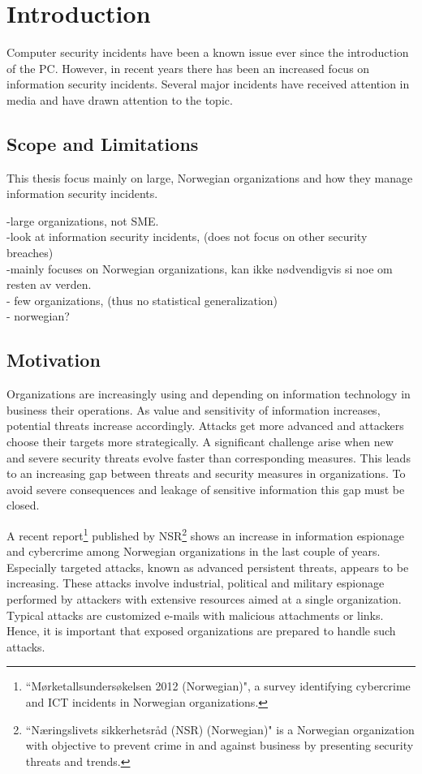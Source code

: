 \chapter{Introduction}
Computer security incidents have been a known issue ever since the introduction of the PC. However, in recent years there has been an increased focus on information security incidents. Several major incidents have received attention in media and have drawn attention to the topic. %

\section{Scope and Limitations}
This thesis focus mainly on large, Norwegian organizations and how they manage information security incidents.

-large organizations, not SME.\\
-look at information security incidents, (does not focus on other security breaches)\\
-mainly focuses on Norwegian organizations, kan ikke nødvendigvis si noe om resten av verden.\\
- few organizations, (thus no statistical generalization)\\
- norwegian?

\section{Motivation}
Organizations are increasingly using and depending on information technology in business their operations. As value and sensitivity of information increases, potential threats increase accordingly. Attacks get more advanced and attackers choose their targets more strategically. A significant challenge arise when new and severe security threats evolve faster than corresponding measures. This leads to an increasing gap between threats and security measures in organizations. To avoid severe consequences and leakage of sensitive information this gap must be closed.

A recent report\footnote{``Mørketallsundersøkelsen 2012 (Norwegian)", a survey identifying cybercrime and \ac{ICT} incidents in Norwegian organizations.} published by NSR\footnote{``Næringslivets sikkerhetsråd (NSR) (Norwegian)" is a Norwegian organization with objective to prevent crime in and against business by presenting security threats and trends.} shows an increase in information espionage and cybercrime among Norwegian organizations in the last couple of years\cite{Morketall2012}. Especially targeted attacks, known as advanced persistent threats, appears to be increasing. These attacks involve industrial, political and military espionage performed by attackers with extensive resources aimed at a single organization. Typical attacks are customized e-mails with malicious attachments or links. Hence, it is important that exposed organizations are prepared to handle such attacks. 

